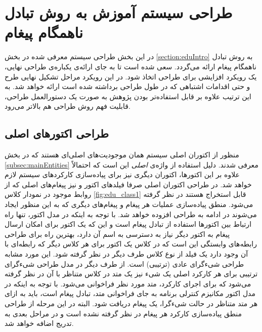 \newpage
\section{طراحی سیستم آموزش به روش تبادل ناهمگام پیغام}
در این بخش طراحی سیستم معرفی شده در بخش \ref{section:eduIntro} به روش تبادل ناهمگام پیغام ارائه می‌گردد. سعی شده است تا به جای ارائه‌ی یکباره‌ی طراحی نهایی، یک رویکرد \gls{افزایشی} برای طراحی اتخاذ شود. در این رویکرد مراحل تشکیل نهایی طرح و حتی اقدامات اشتباهی که در طول طراحی برداشته شده است ارائه خواهد شد. به  این ترتیب علاوه بر قابل استفاده‌تر بودن پژوهش به صورت یک دستورالعمل  طراحی، قابلیت فهم روش طراحی هم بالاتر می‌رود.
\subsection{طراحی اکتور‌های اصلی}
منظور از اکتوران اصلی سیستم همان موجودیت‌های اصلی‌ای هستند که در بخش \ref{subsec:mainEntities} معرفی شدند. دلیل استفاده از واژه‌ی \textit{اصلی}  این است که احتمالاً علاوه بر این اکتورها، اکتوران دیگری نیز برای پیاده‌سازی کارکردهای سیستم لازم خواهد شد. در طراحی اکتوران اصلی صرفا فیلد‌های اکتور و نیز پیغام‌های اصلی که از روابط موجود در نمودار کلاس \ref{fig:edu_class1} قابل استخراج هستند در نظر گرفته ‌می‌شود. منطق پیاده‌سازی عملیات هر پیغام و  پیغام‌های دیگری که به این منظور ایجاد می‌شوند در ادامه به طراحی افزوده خواهد شد. 
با توجه به اینکه در مدل اکتور،‌ تنها راه ارتباط بین اکتور‌ها استفاده از تبادل پیغام است و این که یک اکتور برای امکان ارسال پیغام به اکتور دیگر نیاز به دسترسی به اسم آن دارد، بهترین راه برای طراحی رابطه‌های وابستگی این است که در کلاس یک اکتور برای هر کلاس دیگر که رابطه‌ای با آن وجود دارد یک فیلد از نوع کلاس طرف دیگر در نظر گرفته شود. این مورد مشابه طراحی شیءگرای عادی (ترتیبی) است. از طرف دیگر در مدل طراحی شیءگرای ترتیبی برای هر کارکرد اصلی یک شیء نیز یک متد در کلاس متناظر با آن در نظر گرفته می‌شود که برای اجرای کارکرد، متد مورد نظر فراخوانی می‌شود. با توجه به اینکه در مدل اکتور مکانیزم کنترلی برنامه به جای فراخوانی متد، تبادل پیغام است، باید به ازای هر متد متناظر در حالت شیءگرا، یک پیغام دریافت شود. البته در این مرحله از طراحی منطق پیاده‌سازی کارکرد هر پیغام در نظر گرفته نشده است و در مراحل بعدی به تدریج اضافه خواهد شد.
